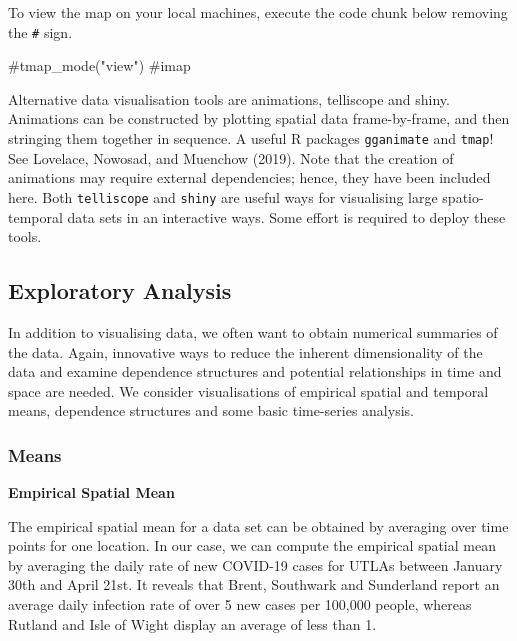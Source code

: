 \documentclass[
  letterpaper,
  krantz2]{style/krantz}
\newenvironment{Shaded}{\begin{snugshade}}{\end{snugshade}}
\newcommand{\CommentTok}[1]{\textcolor[rgb]{0.37,0.37,0.37}{#1}}
\begin{document}
To view the map on your local machines, execute the code chunk below
removing the \texttt{\#} sign.

\begin{Shaded}
\begin{Highlighting}[]
\CommentTok{\#tmap\_mode("view")}
\CommentTok{\#imap}
\end{Highlighting}
\end{Shaded}

Alternative data visualisation tools are animations, telliscope and
shiny. Animations can be constructed by plotting spatial data
frame-by-frame, and then stringing them together in sequence. A useful R
packages \texttt{gganimate} and \texttt{tmap}! See Lovelace, Nowosad,
and Muenchow (2019). Note that the creation of animations may require
external dependencies; hence, they have been included here. Both
\texttt{telliscope} and \texttt{shiny} are useful ways for visualising
large spatio-temporal data sets in an interactive ways. Some effort is
required to deploy these tools.

\hypertarget{exploratory-analysis-1}{%
\subsection{Exploratory Analysis}\label{exploratory-analysis-1}}

In addition to visualising data, we often want to obtain numerical
summaries of the data. Again, innovative ways to reduce the inherent
dimensionality of the data and examine dependence structures and
potential relationships in time and space are needed. We consider
visualisations of empirical spatial and temporal means, dependence
structures and some basic time-series analysis.

\hypertarget{means}{%
\subsubsection{Means}\label{means}}

\textbf{Empirical Spatial Mean}

The empirical spatial mean for a data set can be obtained by averaging
over time points for one location. In our case, we can compute the
empirical spatial mean by averaging the daily rate of new COVID-19 cases
for UTLAs between January 30th and April 21st. It reveals that Brent,
Southwark and Sunderland report an average daily infection rate of over
5 new cases per 100,000 people, whereas Rutland and Isle of Wight
display an average of less than 1.
\end{document}

